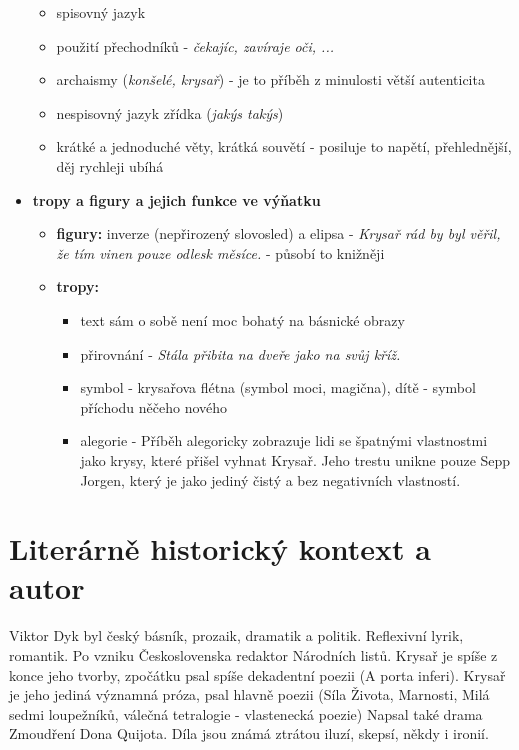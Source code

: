 \documentclass[11pt]{article}
\begin{document}
\begin{itemize}
\begin{itemize}
            \item spisovný jazyk
            \item použití přechodníků - \textit{čekajíc, zavíraje oči, ...} 
            \item archaismy (\textit{konšelé, krysař}) - je to příběh z minulosti  větší autenticita
            \item nespisovný jazyk zřídka (\textit{jakýs takýs})
            \item krátké a jednoduché věty, krátká souvětí - posiluje to napětí, přehlednější, děj rychleji ubíhá
        \end{itemize}
        \item\textbf{tropy a figury a jejich funkce ve výňatku}
        \begin{itemize}
            \item\textbf{figury:} inverze (nepřirozený slovosled) a elipsa - \textit{Krysař rád by byl věřil, že tím vinen pouze odlesk měsíce.} - působí to knižněji
            \item\textbf{tropy:}
            \begin{itemize}
                \item text sám o sobě není moc bohatý na básnické obrazy
                \item přirovnání - \textit{Stála přibita na dveře jako na svůj kříž.}
                \item symbol - krysařova flétna (symbol moci, magična), dítě - symbol příchodu něčeho nového
                \item alegorie - Příběh alegoricky zobrazuje lidi se špatnými vlastnostmi jako krysy, které přišel vyhnat Krysař. Jeho trestu unikne pouze Sepp Jorgen, který je jako jediný čistý a bez negativních vlastností.
            \end{itemize}
        \end{itemize}
    \end{itemize}
    \section*{Literárně historický kontext a autor}
    Viktor Dyk byl český básník, prozaik, dramatik a politik.
    Reflexivní lyrik, romantik.
    Po vzniku Československa redaktor Národních listů.
    Krysař je spíše z konce jeho tvorby, zpočátku psal spíše dekadentní poezii (A porta inferi).
    Krysař je jeho jediná významná próza, psal hlavně poezii (Síla Života, Marnosti, Milá sedmi loupežníků, válečná tetralogie - vlastenecká poezie)
    Napsal také drama Zmoudření Dona Quijota.
    Díla jsou známá ztrátou iluzí, skepsí, někdy i ironií.
\end{document}

